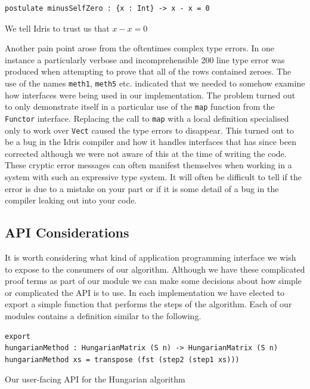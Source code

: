 \documentclass[a4paper, notitlepage]{report}
\begin{document}
\begin{listing}[H]
\begin{verbatim}
postulate minusSelfZero : {x : Int} -> x - x = 0
\end{verbatim}
\caption{We tell Idris to trust us that \(x\mathbin{-} x \mathrel{=} 0\)}
\end{listing}

Another pain point arose from the oftentimes complex type errors. In one
instance a particularly verbose and incomprehensible 200 line type error was
produced when attempting to prove that all of the rows contained zeroes. The use
of the names \texttt{meth1}, \texttt{meth5} etc. indicated that we needed to somehow examine how
interfaces were being used in our implementation. The problem turned out to only
demonstrate itself in a particular use of the \texttt{map} function from the \texttt{Functor}
interface. Replacing the call to \texttt{map} with a local definition specialised only to
work over \texttt{Vect} caused the type errors to disappear. This turned out to be a bug
in the Idris compiler and how it handles interfaces that has since been
corrected although we were not aware of this at the time of writing the code.
These cryptic error messages can often manifest themselves when working in a
system with such an expressive type system. It will often be difficult to tell
if the error is due to a mistake on your part or if it is some detail of a bug
in the compiler leaking out into your code.

\subsection{API Considerations}
\label{sec:orgbd57e9f}
It is worth considering what kind of application programming interface we wish
to expose to the consumers of our algorithm. Although we have these complicated
proof terms as part of our module we can make some decisions about how simple or
complicated the API is to use. In each implementation we have elected to export
a simple function that performs the steps of the algorithm. Each of our modules
contains a definition similar to the following.

\begin{listing}[H]
\begin{verbatim}
export
hungarianMethod : HungarianMatrix (S n) -> HungarianMatrix (S n)
hungarianMethod xs = transpose (fst (step2 (step1 xs)))
\end{verbatim}
\caption{Our user-facing API for the Hungarian algorithm}
\end{listing}
\end{document}
